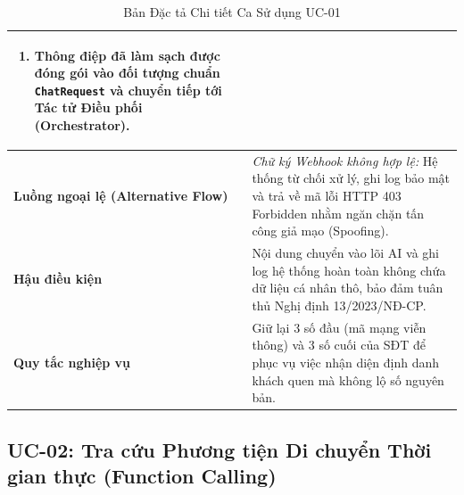 \begin{table}[h!]
\begin{tabular}{|p{3.2cm}|p{11.5cm}|}
\begin{enumerate}
\begin{itemize}
        \item Email: $tuan@gmail.com \longrightarrow \text{[PROTECTED\_EMAIL]}$.
    \end{itemize}
    \item Thông điệp đã làm sạch được đóng gói vào đối tượng chuẩn \texttt{ChatRequest} và chuyển tiếp tới Tác tử Điều phối (Orchestrator).
\end{enumerate} \\
\hline
\textbf{Luồng ngoại lệ (Alternative Flow)} & 
\textit{Chữ ký Webhook không hợp lệ:} Hệ thống từ chối xử lý, ghi log bảo mật và trả về mã lỗi HTTP 403 Forbidden nhằm ngăn chặn tấn công giả mạo (Spoofing). \\
\hline
\textbf{Hậu điều kiện} & Nội dung chuyển vào lõi AI và ghi log hệ thống hoàn toàn không chứa dữ liệu cá nhân thô, bảo đảm tuân thủ Nghị định 13/2023/NĐ-CP. \\
\hline
\textbf{Quy tắc nghiệp vụ} & Giữ lại 3 số đầu (mã mạng viễn thông) và 3 số cuối của SĐT để phục vụ việc nhận diện định danh khách quen mà không lộ số nguyên bản. \\
\hline
\end{tabular}
\caption{Bản Đặc tả Chi tiết Ca Sử dụng UC-01}
\label{tab:spec_uc01}
\end{table}

\subsection{UC-02: Tra cứu Phương tiện Di chuyển Thời gian thực (Function Calling)}
\label{subsec:spec_uc02}

